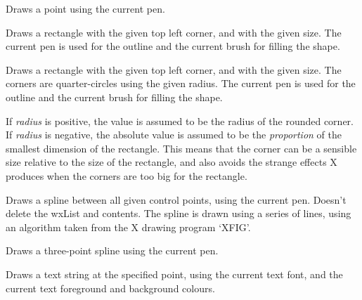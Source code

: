 Draws a point using the current pen.



Draws a rectangle with the given top left corner, and with the given
size.  The current pen is used for the outline and the current brush for
filling the shape.



Draws a rectangle with the given top left corner, and with the given
size. The corners are quarter-circles using the given radius. The
current pen is used for the outline and the current brush for filling
the shape.

If {\it radius} is positive, the value is assumed to be the
radius of the rounded corner. If {\it radius} is negative,
the absolute value is assumed to be the {\it proportion} of the smallest
dimension of the rectangle. This means that the corner can be
a sensible size relative to the size of the rectangle, and also avoids
the strange effects X produces when the corners are too big for
the rectangle.



Draws a spline between all given control points, using the current
pen.  Doesn't delete the wxList and contents. The spline is drawn
using a series of lines, using an algorithm taken from the X drawing
program `XFIG'.


Draws a three-point spline using the current pen.

\label{wxcanvasdrawtext}


Draws a text string at the specified point, using the current text font,
and the current text foreground and background colours.

\label{wxcanvasenablescrolling}

